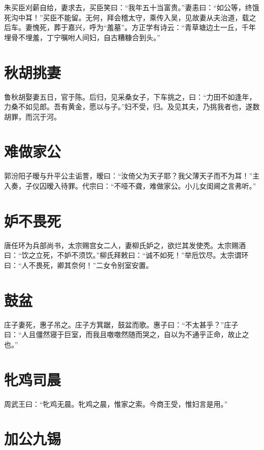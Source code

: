 \documentclass[a4paper,12pt,UTF8,twoside]{ctexbook}
\begin{document}
    朱买臣刈薪自给，妻求去，买臣笑曰：“我年五十当富贵。”妻恚曰：“如公等，终饿死沟中耳！”买臣不能留。无何，拜会稽太守，乘传入吴，见故妻从夫治道，载之后车。妻愧死，葬于嘉兴，呼为“羞墓”。方正学有诗云：“青草塘边土一丘，千年埋骨不埋羞，丁宁嘱咐人间妇，自古糟糠合到头。”
    
    \section{秋胡挑妻}
    
    鲁秋胡娶妻五日，官于陈。后归，见采桑女子，下车挑之，曰：“力田不如逢年，力桑不如见郎。吾有黄金，愿以与子。”妇不受，归。及见其夫，乃挑我者也，遂数胡罪，而沉于河。
    
    \section{难做家公}
    
    郭汾阳子暧与升平公主诟詈，暧曰：“汝倚父为天子耶？我父薄天子而不为耳！”主入奏，子仪囚暧入待罪。代宗曰：“不哑不聋，难做家公。小儿女闺阃之言弗听。”
    
    \section{妒不畏死}
    
    唐任环为兵部尚书，太宗赐宫女二人，妻柳氏妒之，欲烂其发使秃。太宗赐酒曰：“饮之立死，不妒不须饮。”柳氏拜敕曰：“诚不如死！”举卮饮尽。太宗谓环曰：“人不畏死，卿其奈何！”二女令别室安置。
    
    \section{鼓盆}
    
    庄子妻死，惠子吊之。庄子方箕踞，鼓盆而歌。惠子曰：“不太甚乎？”庄子曰：“人且僵然寝于巨室，而我且噭噭然随而哭之，自以为不通乎正命，故止之也。”
    
    \section{牝鸡司晨}
    
    周武王曰：“牝鸡无晨。牝鸡之晨，惟家之索。今商王受，惟妇言是用。”
    
    \section{加公九锡}
    
\end{document}
